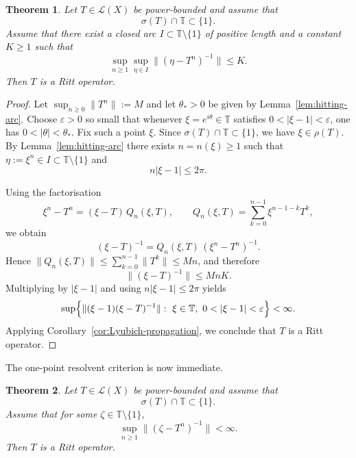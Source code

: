 \documentclass[11pt]{amsart}
\numberwithin{equation}{section}
\newtheorem{theorem}{Theorem}[section]
\theoremstyle{definition}
\theoremstyle{plain}
\def\T{\mathbb{T}}
\def\L{L}
\renewcommand{\L}{\mathcal L}
\begin{document}
\begin{theorem}\label{thm:arc-resolvent-powers-ritt}
Let \(T\in\L(X)\) be power-bounded and assume that
\[
  \sigma(T)\cap\T\subset\{1\}.
\]
Assume that there exist a closed arc $I\subset\T\setminus\{1\}$ of positive length
and a constant $K\ge1$ such that
\begin{equation}\label{eq:powerwise-arc-resolvent}
  \sup_{n\ge1}\sup_{\eta\in I}\|(\eta -T^n)^{-1}\|\le K.
\end{equation}
Then $T$ is a Ritt operator.
\end{theorem}

\begin{proof}
Let $\sup_{n \ge 0} \|T^n\|:=M$  and
let $\theta_*>0$ be given by Lemma~\ref{lem:hitting-arc}. Choose $\varepsilon>0$ so small that
whenever $\xi=e^{i\theta}\in\T$ satisfies $0<|\xi-1|<\varepsilon$, one has $0<|\theta|<\theta_*$. Fix such a point $\xi$.
Since $\sigma(T)\cap\T\subset\{1\}$, we have $\xi\in\rho(T)$. By Lemma~\ref{lem:hitting-arc} there exists
$n=n(\xi)\ge1$ such that $\eta:=\xi^n\in I\subset\T\setminus\{1\}$ and
\[
  n|\xi-1|\le 2\pi.
\]

Using the factorisation
\[
  \xi^n -T^n=(\xi -T)\,Q_n(\xi,T),
  \qquad
  Q_n(\xi,T)=\sum_{k=0}^{n-1}\xi^{n-1-k}T^k,
\]
we obtain
\[
  (\xi -T)^{-1}=Q_n(\xi,T)\,(\xi^n -T^n)^{-1}.
\]
Hence $\|Q_n(\xi,T)\|\le \sum_{k=0}^{n-1}\|T^k\|\le Mn$, and therefore
\[
  \|(\xi -T)^{-1}\|\le MnK.
\]
Multiplying by $|\xi-1|$ and using $n|\xi-1|\le 2\pi$ yields
\begin{equation}\label{eq:local-Ritt-circle-arc}
  \sup\Bigl\{\|(\xi-1)(\xi -T)^{-1}\|:\ \xi\in\T,\ 0<|\xi-1|<\varepsilon\Bigr\}<\infty.
\end{equation}
Applying Corollary~\ref{cor:Lyubich-propagation},
we conclude that \(T\) is a Ritt operator.
\end{proof}




The one-point resolvent criterion is now immediate.

\begin{theorem}\label{thm:one-point-power-Kato}
Let $T\in\L(X)$ be power-bounded and assume that
\[
  \sigma(T)\cap\T\subset\{1\}.
\]
Assume that for some $\zeta\in\T\setminus\{1\}$,
\[
  \sup_{n\ge1}\|(\zeta -T^n)^{-1}\|<\infty.
\]
Then $T$ is a Ritt operator.
\end{theorem}
\end{document}
